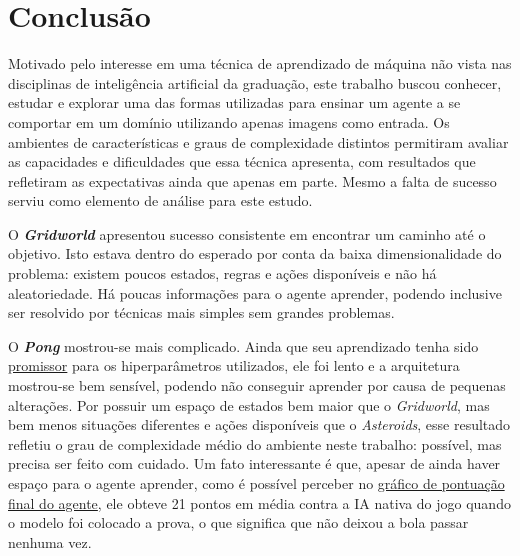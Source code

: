 
\chapter{Conclusão}
\label{cap:conclusoes}

Motivado pelo interesse em uma técnica de aprendizado de máquina não vista nas disciplinas de inteligência artificial da graduação, este trabalho buscou conhecer, estudar e explorar uma das formas utilizadas para ensinar um agente a se comportar em um domínio utilizando apenas imagens como entrada.
Os ambientes de características e graus de complexidade distintos permitiram avaliar as capacidades e dificuldades que essa técnica apresenta, com resultados que refletiram as expectativas ainda que apenas em parte.
Mesmo a falta de sucesso serviu como elemento de análise para este estudo.

O \textbf{\textit{Gridworld}} apresentou sucesso consistente em encontrar um caminho até o objetivo.
Isto estava dentro do esperado por conta da baixa dimensionalidade do problema:
existem poucos estados, regras e ações disponíveis e não há aleatoriedade.
Há poucas informações para o agente aprender, podendo inclusive ser resolvido por técnicas mais simples sem grandes problemas.

O \textbf{\textit{Pong}} mostrou-se mais complicado.
Ainda que seu aprendizado tenha sido \hyperref[fig:pong_score]{promissor} para os hiperparâmetros utilizados, ele foi lento e a arquitetura mostrou-se bem sensível, podendo não conseguir aprender por causa de pequenas alterações.
Por possuir um espaço de estados bem maior que o \textit{Gridworld}, mas bem menos situações diferentes e ações disponíveis que o \textit{Asteroids}, esse resultado refletiu o grau de complexidade médio do ambiente neste trabalho: possível, mas precisa ser feito com cuidado.
Um fato interessante é que, apesar de ainda haver espaço para o agente aprender, como é possível perceber no \hyperref[fig:pong_score]{gráfico de pontuação final do agente}, ele obteve 21 pontos em média contra a IA nativa do jogo quando o modelo foi colocado a prova, o que significa que não deixou a bola passar nenhuma vez.

